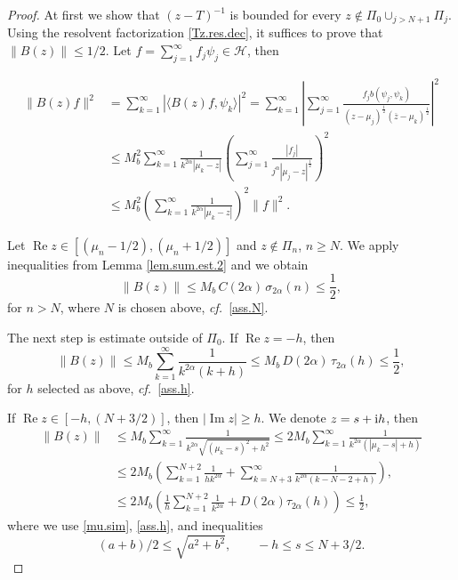 \begin{proof}
At first we show that $(z-T)^{-1}$ is bounded for every $z \notin \Pi_0 \cup_{j>N+1}\Pi_j$. Using the resolvent factorization \eqref{Tz.res.dec}, it suffices to prove that $\|B(z)\| \leq 1/2$. Let $f = \sum_{j=1}^{\infty} f_j \psi_j \in {{\mathcal{H}}}$, then

\begin{equation}\label{loc.est.1}
\begin{aligned}
\|B(z)f\|^2  &= 
\sum_{k=1}^{\infty} |\langle B(z) f, \psi_k \rangle|^2 
= 
\sum_{k=1}^{\infty} 
\left| 
\sum_{j=1}^{\infty} \frac{f_j b(\psi_j,\psi_k) }{(z-\mu_j)^{\frac{1}{2}} (\overline{z}-\mu_k)^{\frac{1}{2}}}
\right|^2 
\\
&\leq 
M_b^2 \sum_{k=1}^{\infty} 
\frac{1}{k^{2\alpha}|\mu_k-z|}
\left(
\sum_{j=1}^{\infty} \frac{|f_j|}{ j^{\alpha}|\mu_j-z|^{\frac{1}{2}}}
\right)^2 
\\
&
\leq 
M_b^2 
\left(
\sum_{k=1}^{\infty} 
\frac{1}{k^{2\alpha}|\mu_k -z|}
\right)^2
\|f\|^2.
\end{aligned}
\end{equation}

Let ${\operatorname{Re}} z \in [(\mu_n-1/2),(\mu_n+1/2)]$ and $z \notin \Pi_n$, $n \geq N$. We apply inequalities from Lemma \ref{lem.sum.est.2} and we obtain
\begin{equation}\label{loc.est.2}
\|B(z)\| 
\leq
M_b \, C(2\alpha) \, \sigma_{2\alpha} (n)
\leq \frac{1}{2},
\end{equation}
for $n >N$, where $N$ is chosen above, {\emph{cf.}}~\eqref{ass.N}. 

The next step is estimate outside of $\Pi_0$.
If ${\operatorname{Re}} z = - h$, then
\begin{equation*}
 \|B(z)\|
\leq 
M_b 
\sum_{k=1}^{\infty} \frac{1}{ k^{2\alpha}(k+h) }
\leq 
M_b \, D(2\alpha) \, \tau_{2\alpha}(h)
\leq
\frac{1}{2},
\end{equation*}
for $h$ selected as above, {\emph{cf.}}~\eqref{ass.h}.

If ${\operatorname{Re}} z \in [ - h, (N+3/2)]$, then $|{\operatorname{Im}} z| \geq h$. We denote $z= s+{{\rm i}} h$, then
\begin{equation*}
\begin{aligned}
\|B(z)\| 
&\leq 
M_b 
\sum_{k=1}^{\infty} \frac{1}{k^{2\alpha} \sqrt{(\mu_k-s)^2 +h^2 }}
\leq 
2  M_b
\sum_{k=1}^{\infty} \frac{1}{k^{2\alpha} (|\mu_k-s| +h) }
\\
&
\leq 
2  M_b
\left(
\sum_{k=1}^{N+2} \frac{1}{h k^{2\alpha}} +
\sum_{k=N+3}^{\infty} \frac{1}{k^{2\alpha} (k- N-2 +h) }
\right),
\\
&
\leq 
2  M_b
\left(
\frac{1}{h} \sum_{k=1}^{N+2} \frac{1}{k^{2\alpha}} +
D(2\alpha) \tau_{2\alpha}(h)
\right)
\leq
\frac{1}{2}
,
\end{aligned}
\end{equation*}
where we use \eqref{mu.sim}, \eqref{ass.h}, and inequalities 
$$(a+b)/2 \leq \sqrt{a^2 + b^2}, \qquad -h \leq s  \leq N+3/2.$$


\end{proof}
